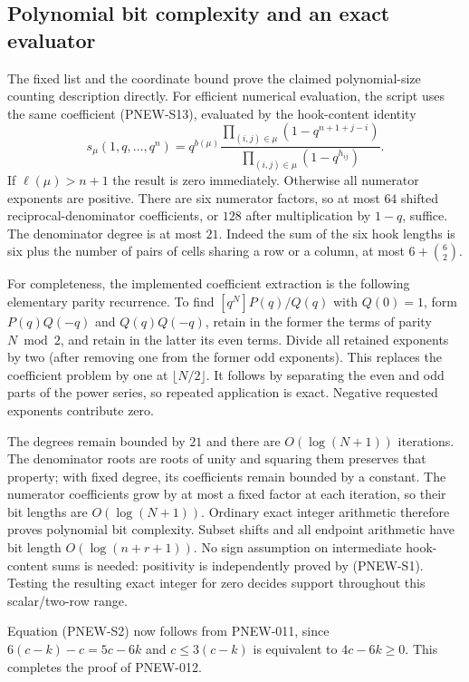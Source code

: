 \subsection{Polynomial bit complexity and an exact evaluator}
The fixed list and the coordinate bound prove the claimed
polynomial-size counting description directly.  For efficient
numerical evaluation, the script uses the same coefficient
(PNEW-S13), evaluated by the hook-content identity
\[
 s_\mu(1,q,\ldots,q^n)
    =q^{b(\mu)}
       \frac{\prod_{(i,j)\in\mu}(1-q^{n+1+j-i})}
            {\prod_{(i,j)\in\mu}(1-q^{h_{ij}})}.
 \tag{PNEW-S16}
\]
If $\ell(\mu)>n+1$ the result is zero immediately.  Otherwise
all numerator exponents are positive.  There are six numerator
factors, so at most $64$ shifted reciprocal-denominator
coefficients, or $128$ after multiplication by $1-q$, suffice.
The denominator degree is at most $21$.  Indeed the sum of
the six hook lengths is six plus the number of pairs of
cells sharing a row or a column, at most $6+\binom62$.

For completeness, the implemented coefficient extraction is
the following elementary parity recurrence.  To find
$[q^N]P(q)/Q(q)$ with $Q(0)=1$, form
$P(q)Q(-q)$ and $Q(q)Q(-q)$, retain in the former the terms
of parity $N\bmod2$, and retain in the latter its even
terms.  Divide all retained exponents by two (after removing
one from the former odd exponents).  This replaces the
coefficient problem by one at $\lfloor N/2\rfloor$.
It follows by separating the even and odd parts of the
power series, so repeated application is exact.
Negative requested exponents contribute zero.

The degrees remain bounded by $21$ and there are
$O(\log(N+1))$ iterations.  The denominator roots are roots
of unity and squaring them preserves that property; with
fixed degree, its coefficients remain bounded by a constant.
The numerator coefficients grow by at most a fixed factor
at each iteration, so their bit lengths are
$O(\log(N+1))$.  Ordinary exact integer arithmetic therefore
proves polynomial bit complexity.  Subset shifts and all
endpoint arithmetic have bit length $O(\log(n+r+1))$.
No sign assumption on intermediate hook-content sums is
needed: positivity is independently proved by (PNEW-S1).
Testing the resulting exact integer for zero decides support
throughout this scalar/two-row range.

Equation (PNEW-S2) now follows from PNEW-011, since
$6(c-k)-c=5c-6k$ and $c\le3(c-k)$ is equivalent to
$4c-6k\ge0$.  This completes the proof of PNEW-012.

